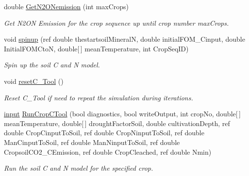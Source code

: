 \begin{DoxyCompactItemize}
\mbox{\label{class_crop_sequence_class_ae402c0ecf57d9641eaaa030949132b02}} 
double \mbox{\hyperlink{class_crop_sequence_class_ae402c0ecf57d9641eaaa030949132b02}{Get\+N2\+O\+Nemission}} (int max\+Crops)
\begin{DoxyCompactList}\small\item\em Get N2\+ON Emission for the crop sequence up until crop number max\+Crops. \end{DoxyCompactList}\item 
void \mbox{\hyperlink{class_crop_sequence_class_ae05480cc30f8329951f9cb63ecb6ced5}{spinup}} (ref double thestartsoil\+MineralN, double initial\+F\+O\+M\+\_\+\+Cinput, double Initial\+F\+O\+M\+CtoN, double\mbox{[}$\,$\mbox{]} mean\+Temperature, int Crop\+Seq\+ID)
\begin{DoxyCompactList}\small\item\em Spin up the soil C and N model. \end{DoxyCompactList}\item 
\mbox{\label{class_crop_sequence_class_ad7552e1e3639be6dbd5668e7d458b263}} 
void \mbox{\hyperlink{class_crop_sequence_class_ad7552e1e3639be6dbd5668e7d458b263}{reset\+C\+\_\+\+Tool}} ()
\begin{DoxyCompactList}\small\item\em Reset C\+\_\+\+Tool if need to repeat the simulation during iterations. \end{DoxyCompactList}\item 
\mbox{\label{class_crop_sequence_class_ae0df410d4d819c07bcc6f3b4ad00cd8b}} 
\mbox{\hyperlink{struct_crop_sequence_class_1_1input}{input}} \mbox{\hyperlink{class_crop_sequence_class_ae0df410d4d819c07bcc6f3b4ad00cd8b}{Run\+Crop\+C\+Tool}} (bool diagnostics, bool write\+Output, int crop\+No, double\mbox{[}$\,$\mbox{]} mean\+Temperature, double\mbox{[}$\,$\mbox{]} drought\+Factor\+Soil, double cultivation\+Depth, ref double Crop\+Cinput\+To\+Soil, ref double Crop\+Ninput\+To\+Soil, ref double Man\+Cinput\+To\+Soil, ref double Man\+Ninput\+To\+Soil, ref double Cropsoil\+C\+O2\+\_\+\+C\+Emission, ref double Crop\+Cleached, ref double Nmin)
\begin{DoxyCompactList}\small\item\em Run the soil C and N model for the specified crop. \end{DoxyCompactList}\item 

\end{DoxyCompactItemize}
